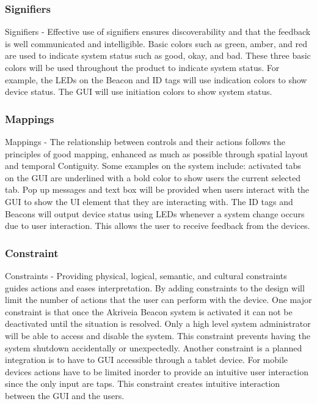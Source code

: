 \subsubsection{Signifiers}
\medskip
Signifiers - Effective use of signifiers ensures discoverability and that the feedback is well communicated and intelligible. Basic colors such as green, amber, and red are used to indicate system status such as good, okay, and bad. These three basic colors will be used throughout the product to indicate system status. For example, the LEDs on the Beacon and ID tags will use indication colors to show device status. The GUI will use initiation colors to show system status.
\medskip

\subsubsection{Mappings}
\medskip
Mappings - The relationship between controls and their actions follows the principles of good mapping, enhanced as much as possible through spatial layout and temporal Contiguity. Some examples on the system include: activated tabs on the GUI are underlined with a bold color to show users the current selected tab. Pop up messages and text box will be provided when users interact with the GUI to show the UI element that they are interacting with. The ID tags and Beacons will output device status using LEDs whenever a system change occurs due to user interaction. This allows the user to receive feedback from the devices.
\medskip


\subsubsection{Constraint}
\medskip
Constraints - Providing physical, logical, semantic, and cultural constraints guides actions and eases interpretation. By adding constraints to the design will limit the number of actions that the user can perform with the device. One major constraint is that once the Akriveia Beacon system is activated it can not be deactivated until the situation is resolved. Only a high level system administrator will be able to access and disable the system. This constraint prevents having the system shutdown accidentally or unexpectedly. Another constraint is a planned integration is to have to GUI accessible through a tablet device. For mobile devices actions have to be limited inorder to provide an intuitive user interaction since the only input are taps. This constraint creates intuitive interaction between the GUI and the users.
